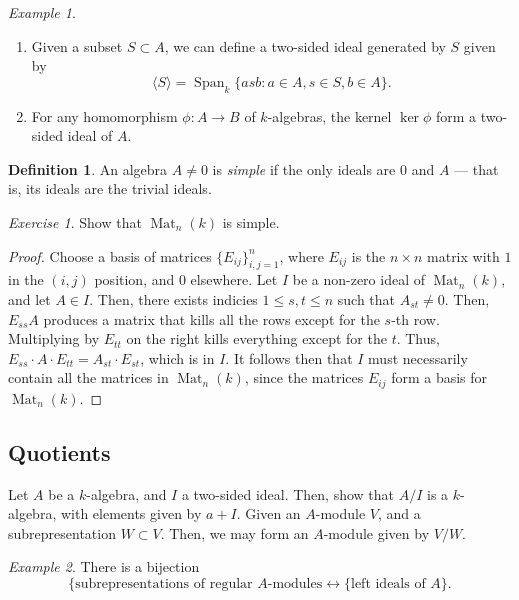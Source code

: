 \documentclass[a4paper]{report}
\theoremstyle{definition}
\newtheorem{definition}{Definition}
\theoremstyle{remark}
\theoremstyle{proposition}
\theoremstyle{conjecture}
\theoremstyle{lemma}
\theoremstyle{corollary}
\theoremstyle{exercise}
\newtheorem{exercise}{Exercise}
\theoremstyle{example}
\newtheorem{example}{Example}
\newcommand{\on}{\operatorname}
\begin{document}
\begin{example}
    \leavevmode
    \begin{enumerate}
        \item Given a subset $S\subset A$, we can define a two-sided 
            ideal generated by $S$ given by $$\langle S\rangle = \on{Span}_k\lbrace asb : a\in A, s\in S, b\in A\rbrace.$$
        \item For any homomorphism $\phi :A \to B$ of $k$-algebras,
            the kernel $\ker\phi$ form a two-sided ideal of $A$.
    \end{enumerate}
\end{example}

\begin{definition}
    An algebra $A\neq 0$ is \emph{simple} if the only ideals are 
    $0$ and $A$ --- that is, its ideals are the trivial ideals.
\end{definition}

\begin{exercise}
    Show that $\on{Mat}_n(k)$ is simple.
\end{exercise}

\begin{proof}
    Choose a basis of matrices $\lbrace E_{ij}\rbrace_{i,j=1}^n$, where 
    $E_{ij}$ is the $n\times n$ matrix with $1$ in the $(i,j)$ position, and
    $0$ elsewhere.
    Let $I$ be a non-zero ideal of $\on{Mat}_n(k)$, and let $A \in I$.
    Then, there exists indicies $1\leq s,t\leq n$ such that 
    $A_{st} \neq 0$. Then, $E_{ss}A$ produces a matrix that kills all
    the rows except for the $s$-th row. Multiplying by $E_{tt}$ on the right
    kills everything except for the $t$.
    Thus, $E_{ss}\cdot A\cdot E_{tt} = A_{st} \cdot E_{st}$, which is in $I$.
    It follows then that $I$ must necessarily contain all the matrices in 
    $\on{Mat}_n(k)$, since the matrices $E_{ij}$ form a basis for 
    $\on{Mat}_n(k)$.
\end{proof}

\subsection{Quotients}

Let $A$ be a $k$-algebra, and $I$ a two-sided ideal. Then, show that 
$A/I$ is a $k$-algebra, with elements given by $a+I$.
Given an $A$-module $V$, and a subrepresentation $W\subset V$.
Then, we may form an $A$-module given by $V/W$.

\begin{example}
    There is a bijection
    $$\lbrace \text{subrepresentations of regular $A$-modules} \longleftrightarrow \lbrace \text{left ideals of $A$}\rbrace.$$
\end{example}
\end{document}
